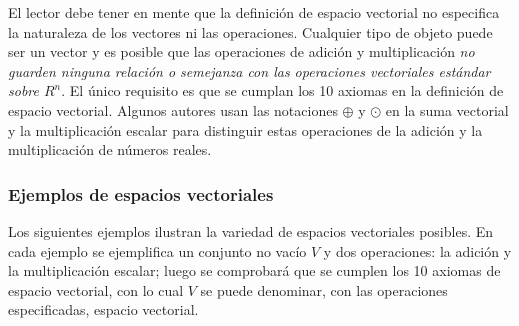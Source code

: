 \documentclass[a4paper,12pt]{article}
\begin{document}
El lector debe tener en mente que la definición de espacio vectorial no
especifica la naturaleza de los vectores ni las operaciones. Cualquier tipo de
objeto puede ser un vector y es posible que las operaciones de adición y
multiplicación \emph{no guarden ninguna relación o semejanza con las
operaciones vectoriales estándar sobre $R^n$}. El único requisito es que se
cumplan los 10 axiomas en la definición de espacio vectorial. Algunos autores
usan las notaciones $\oplus$ y $\odot$ en la suma vectorial y la
multiplicación escalar para distinguir estas operaciones de la adición y la
multiplicación de números reales.

\subsubsection{Ejemplos de espacios vectoriales}

Los siguientes ejemplos ilustran la variedad de espacios vectoriales posibles.
En cada ejemplo se ejemplifica un conjunto no vacío $V$ y dos operaciones: la
adición y la multiplicación escalar; luego se comprobará que se cumplen los 10
axiomas de espacio vectorial, con lo cual $V$ se puede denominar, con las
operaciones especificadas, espacio vectorial.
\end{document}
